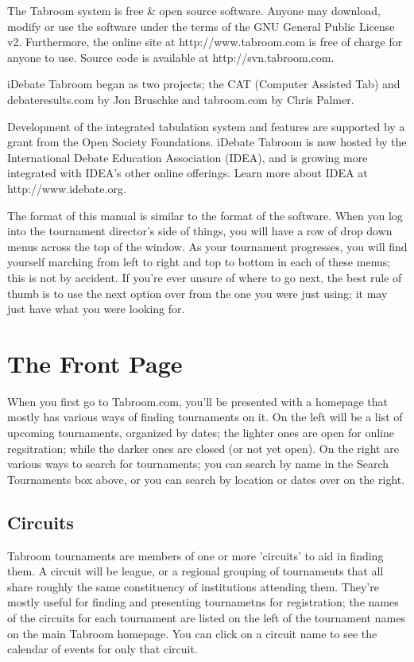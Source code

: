 \documentclass[12pt]{report}
\begin{document}
The Tabroom system is free \& open source software.  Anyone may download,
modify or use the software under the terms of the GNU General Public License
v2.  Furthermore, the online site at http://www.tabroom.com is free of charge
for anyone to use.  Source code is available at http://svn.tabroom.com.

iDebate Tabroom began as two projects; the CAT (Computer Assisted Tab) and
debateresults.com by Jon Bruschke and tabroom.com by Chris Palmer.

Development of the integrated tabulation system and features are supported by a
grant from the Open Society Foundations.  iDebate Tabroom is now hosted by the
International Debate Education Association (IDEA), and is growing more
integrated with IDEA's other online offerings.  Learn more about IDEA at
http://www.idebate.org.

\medskip

The format of this manual is similar to the format of the software.  When you
log into the tournament director's side of things, you will have a row of drop
down menus across the top of the window.    As your tournament progresses, you
will find yourself marching from left to right and top to bottom in each of
these menus; this is not by accident.   If you're ever unsure of where to go
next, the best rule of thumb is to use the next option over from the one you
were just using; it may just have what you were looking for.

\chapter{The Front Page} 

	When you first go to Tabroom.com, you'll be presented with a homepage that
	mostly has various ways of finding tournaments on it.  On the left will be
	a list of upcoming tournaments, organized by dates; the lighter ones are
	open for online regsitration; while the darker ones are closed (or not yet
	open).  On the right are various ways to search for tournaments; you can
	search by name in the Search Tournaments box above, or you can search by
	location or dates over on the right.

	\section{Circuits}

	Tabroom tournaments are members of one or more 'circuits' to aid in finding
	them.  A circuit will be league, or a regional grouping of tournaments that
	all share roughly the same constituency of institutions attending them.
	They're mostly useful for finding and presenting tournametns for
	registration; the names of the circuits for each tournament are listed on
	the left of the tournament names on the main Tabroom homepage.  You can
	click on a circuit name to see the calendar of events for only that
	circuit.
\end{document}
